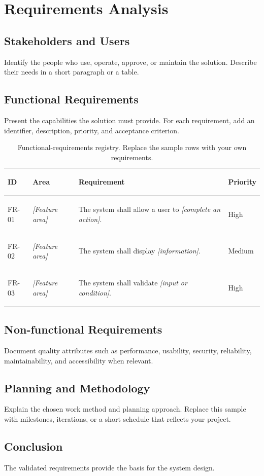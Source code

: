 \chapter{Requirements Analysis}
\label{chap:requirements}

\section{Stakeholders and Users}
Identify the people who use, operate, approve, or maintain the solution. Describe their needs in a short paragraph or a table.

\section{Functional Requirements}
Present the capabilities the solution must provide. For each requirement, add an identifier, description, priority, and acceptance criterion.

\begin{table}[H]
\centering
\small
\setlength{\tabcolsep}{5pt}
\renewcommand{\arraystretch}{1.35}
\begin{tabularx}{\textwidth}{@{}>{\bfseries\raggedright\arraybackslash}p{1.25cm}>{\raggedright\arraybackslash}p{2.65cm}>{\raggedright\arraybackslash}X>{\centering\arraybackslash}p{1.55cm}@{}}
\toprule
\rowcolor{lightblue}
ID & Area & Requirement & Priority \\
\midrule
FR-01 & \textit{[Feature area]} & The system shall allow a user to \textit{[complete an action]}. & High \\
FR-02 & \textit{[Feature area]} & The system shall display \textit{[information]}. & Medium \\
FR-03 & \textit{[Feature area]} & The system shall validate \textit{[input or condition]}. & High \\
\bottomrule
\end{tabularx}
\caption{Functional-requirements registry. Replace the sample rows with your own requirements.}
\label{tab:functional-requirements}
\end{table}

\section{Non-functional Requirements}
Document quality attributes such as performance, usability, security, reliability, maintainability, and accessibility when relevant.

\section{Planning and Methodology}
Explain the chosen work method and planning approach. Replace this sample with milestones, iterations, or a short schedule that reflects your project.

\section*{Conclusion}
The validated requirements provide the basis for the system design.
